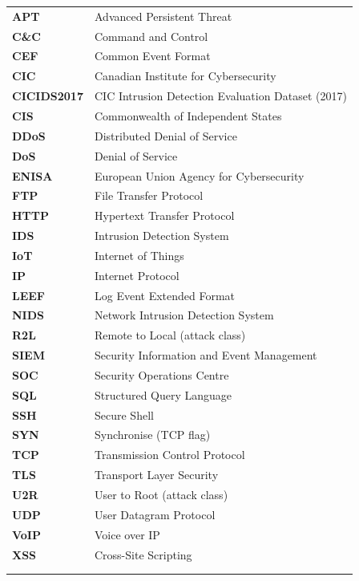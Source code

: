 \begin{longtable}{>{\bfseries}p{3.6cm} p{10.4cm}}
APT        & Advanced Persistent Threat \\
C\&C       & Command and Control \\
CEF        & Common Event Format \\
CIC        & Canadian Institute for Cybersecurity \\
CICIDS2017 & CIC Intrusion Detection Evaluation Dataset (2017) \\
CIS        & Commonwealth of Independent States \\
DDoS       & Distributed Denial of Service \\
DoS        & Denial of Service \\
ENISA      & European Union Agency for Cybersecurity \\
FTP        & File Transfer Protocol \\
HTTP       & Hypertext Transfer Protocol \\
IDS        & Intrusion Detection System \\
IoT        & Internet of Things \\
IP         & Internet Protocol \\
LEEF       & Log Event Extended Format \\
NIDS       & Network Intrusion Detection System \\
R2L        & Remote to Local (attack class) \\
SIEM       & Security Information and Event Management \\
SOC        & Security Operations Centre \\
SQL        & Structured Query Language \\
SSH        & Secure Shell \\
SYN        & Synchronise (TCP flag) \\
TCP        & Transmission Control Protocol \\
TLS        & Transport Layer Security \\
U2R        & User to Root (attack class) \\
UDP        & User Datagram Protocol \\
VoIP       & Voice over IP \\
XSS        & Cross-Site Scripting \\

\addlinespace[0.5em]
\multicolumn{2}{l}{\textit{Machine Learning and Data Science}} \\
\addlinespace[0.2em]


\end{longtable}
